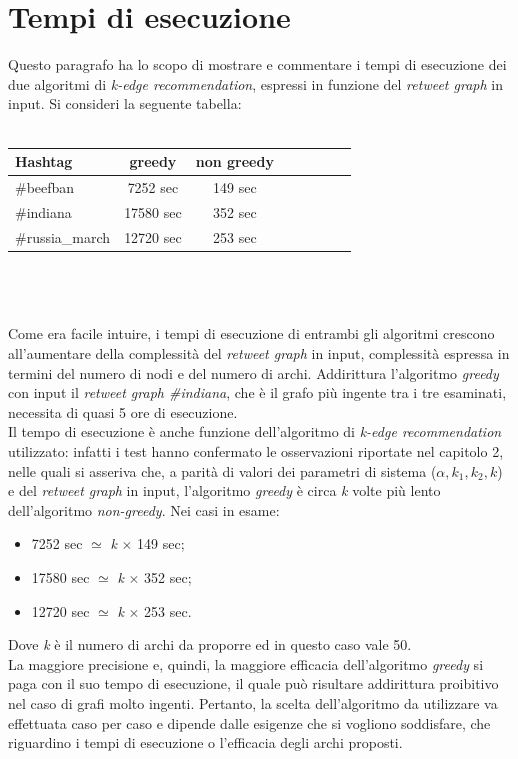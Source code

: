 \section{Tempi di esecuzione}
Questo paragrafo ha lo scopo di mostrare e commentare i tempi di esecuzione dei due algoritmi di \textit{k-edge recommendation}, espressi in funzione del \textit{retweet graph} in input. Si consideri la seguente tabella:
\\\\
\begin{tabular}{l*{6}{c}r}
\textbf{Hashtag}         & \textbf{greedy} & \textbf{non greedy}  \\
\hline
\#beefban 		 & 7252 sec &  149 sec  \\
\#indiana        	 & 17580 sec & 352 sec \\
\#russia\_march   	 & 12720 sec & 253 sec  \\
\end{tabular}
\\\\\\
Come era facile intuire, i tempi di esecuzione di entrambi gli algoritmi crescono all'aumentare della complessità del \textit{retweet graph} in input, complessità espressa in termini del numero di nodi e del numero di archi. Addirittura l'algoritmo \textit{greedy} con input il \textit{retweet graph \#indiana}, che è il grafo più ingente tra i tre esaminati, necessita di quasi 5 ore di esecuzione.  
\\Il tempo di esecuzione è anche funzione dell'algoritmo di \textit{k-edge recommendation} utilizzato: infatti i test hanno confermato le osservazioni riportate nel capitolo 2, nelle quali si asseriva che, a parità di valori dei parametri di sistema ($\alpha, k_1, k_2, k$) e del \textit{retweet graph} in input, l'algoritmo \textit{greedy} è circa \textit{k} volte più lento dell'algoritmo \textit{non-greedy}. Nei casi in esame:
\begin{itemize}
\item 7252 sec $\simeq$  \textit{k} $\times$ 149 sec;
\item 17580 sec $\simeq$ \textit{k} $\times$ 352 sec;
\item 12720 sec $\simeq$ \textit{k} $\times$ 253 sec.
\end{itemize}
Dove \textit{k} è il numero di archi da proporre ed in questo caso vale 50.
\\La maggiore precisione e, quindi, la maggiore efficacia dell'algoritmo \textit{greedy} si paga con il suo tempo di esecuzione, il quale può risultare addirittura proibitivo nel caso di grafi molto ingenti. Pertanto, la scelta dell'algoritmo da utilizzare va effettuata caso per caso e dipende dalle esigenze che si vogliono soddisfare, che riguardino i tempi di esecuzione o l'efficacia degli archi proposti.

